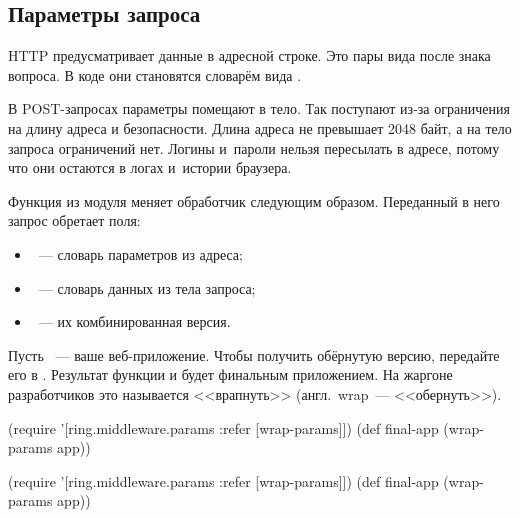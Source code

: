 \subsection{Параметры запроса}

\label{ring-params}


HTTP предусматривает данные в адресной строке. Это пары вида
 после знака вопроса. В коде они становятся
словарём вида .

В POST-запросах параметры помещают в тело. Так поступают из-за ограничения на
длину адреса и безопасности. Длина адреса не превышает 2048 байт, а на тело
запроса ограничений нет. Логины и~пароли нельзя пересылать в адресе, потому что
они остаются в логах и~истории браузера.


Функция  из модуля  меняет
обработчик следующим образом. Переданный в него запрос обретает поля:

\begin{itemize}

\item
  ~--- словарь параметров из адреса;

\item
  ~--- словарь данных из тела запроса;

\item
  ~--- их комбинированная версия.

\end{itemize}

Пусть ~--- ваше веб-приложение. Чтобы получить обёрнутую версию,
передайте его в . Результат функции и будет финальным
приложением. На жаргоне разработчиков это называется <<врапнуть>>
(англ.~wrap~--- <<обернуть>>).


\ifnarrow

\begin{clojure}
(require '[ring.middleware.params
           :refer [wrap-params]])
(def final-app (wrap-params app))
\end{clojure}

\else

\begin{clojure}
(require '[ring.middleware.params :refer [wrap-params]])
(def final-app (wrap-params app))
\end{clojure}

